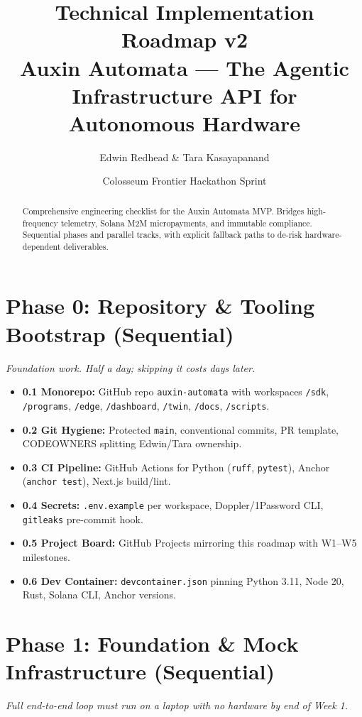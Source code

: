 \documentclass[11pt, a4paper]{article}
\title{\textbf{Technical Implementation Roadmap v2} \\ \large Auxin Automata --- The Agentic Infrastructure API for Autonomous Hardware}
\author{Edwin Redhead \& Tara Kasayapanand}
\date{Colosseum Frontier Hackathon Sprint}
\begin{document}
\maketitle

\begin{abstract}
Comprehensive engineering checklist for the Auxin Automata MVP. Bridges high-frequency telemetry, Solana M2M micropayments, and immutable compliance. Sequential phases and parallel tracks, with explicit fallback paths to de-risk hardware-dependent deliverables.
\end{abstract}

\vspace{1em}

\section{Phase 0: Repository \& Tooling Bootstrap (Sequential)}
\textit{Foundation work. Half a day; skipping it costs days later.}
\begin{itemize}
    \item \textbf{0.1 Monorepo:} GitHub repo \texttt{auxin-automata} with workspaces \texttt{/sdk}, \texttt{/programs}, \texttt{/edge}, \texttt{/dashboard}, \texttt{/twin}, \texttt{/docs}, \texttt{/scripts}.
    \item \textbf{0.2 Git Hygiene:} Protected \texttt{main}, conventional commits, PR template, CODEOWNERS splitting Edwin/Tara ownership.
    \item \textbf{0.3 CI Pipeline:} GitHub Actions for Python (\texttt{ruff}, \texttt{pytest}), Anchor (\texttt{anchor test}), Next.js build/lint.
    \item \textbf{0.4 Secrets:} \texttt{.env.example} per workspace, Doppler/1Password CLI, \texttt{gitleaks} pre-commit hook.
    \item \textbf{0.5 Project Board:} GitHub Projects mirroring this roadmap with W1--W5 milestones.
    \item \textbf{0.6 Dev Container:} \texttt{devcontainer.json} pinning Python 3.11, Node 20, Rust, Solana CLI, Anchor versions.
\end{itemize}

\section{Phase 1: Foundation \& Mock Infrastructure (Sequential)}
\textit{Full end-to-end loop must run on a laptop with no hardware by end of Week 1.}
\end{document}
